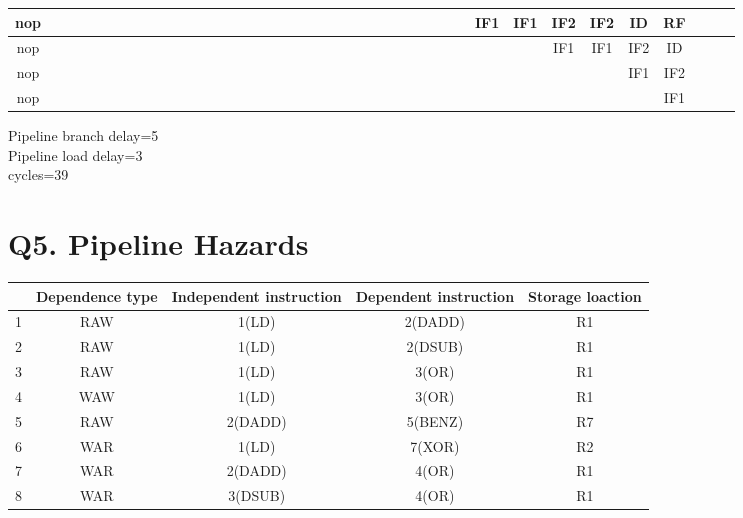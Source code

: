 \documentclass[12pt]{article}
\begin{document}
\begin{enumerate}[a)]
\begin{table}[!hbp]
{\begin{tabular}{|c|c|c|c|c|c|c|c|c|c|c|c|c|c|c|c|c|c|c|c|c|c|c|c|c|c|c|c|c|c|c|c|c|c|c|c|c|c|c|c|}
		\hline 		
		nop &   &   &   &   &   &   &   &   &   & &   &    & &  &  &  &  &  &   &   &   &   &   &   &   &   &   &   &   &   &  IF1 & IF1 & IF2 & IF2 & ID & RF   &   &   &   \\ 
		\hline
		nop &   &   &   &   &   &   &   &   &   & &   &  &  &  &  &  &  &   &   &   &   &   &   &   &   &   &   &   &   &  &  &  & IF1 & IF1 & IF2 & ID    &   &   &   \\ 
		\hline 		
		nop &   &   &   &   &   &   &   &   &   & &   &  &  &  &  &  &  &   &   &   &   &   &   &   &   &   &   &   &   &   &  &  &  &  & IF1 & IF2   &   &   &   \\ 
		\hline 
		nop &   &   &   &   &   &   &   &   &   & &   &  &  &  &  &  &  &   &   &   &   &   &   &   &   &   &   &   &   &    &  &  &  &  &  & IF1  &   &   &   \\ 
		\hline 
		\end{tabular} 
	}
	\end{table}
	
	Pipeline branch delay=5\\
	Pipeline load delay=3\\
	cycles=39
\end{enumerate}
\section{Q5. Pipeline Hazards}
	\begin{tabular}{|c|c|c|c|c|}
	\hline 
	 & Dependence type & Independent instruction & Dependent instruction & Storage loaction \\ 
	\hline 
	1 & RAW & 1(LD) & 2(DADD) & R1 \\ 
	\hline 
	2 & RAW & 1(LD) & 2(DSUB) & R1 \\ 
	\hline 
	3 & RAW & 1(LD) & 3(OR) & R1 \\ 
	\hline 
	4 & WAW & 1(LD) & 3(OR) & R1 \\ 
	\hline 
	5 & RAW & 2(DADD) & 5(BENZ) & R7 \\ 
	\hline 
	6 & WAR & 1(LD) & 7(XOR) & R2\\
	\hline
	7 & WAR & 2(DADD) &4(OR) & R1\\
	\hline
	8 & WAR & 3(DSUB) & 4(OR) &R1\\
	\hline 
	\end{tabular} 
\end{document}
